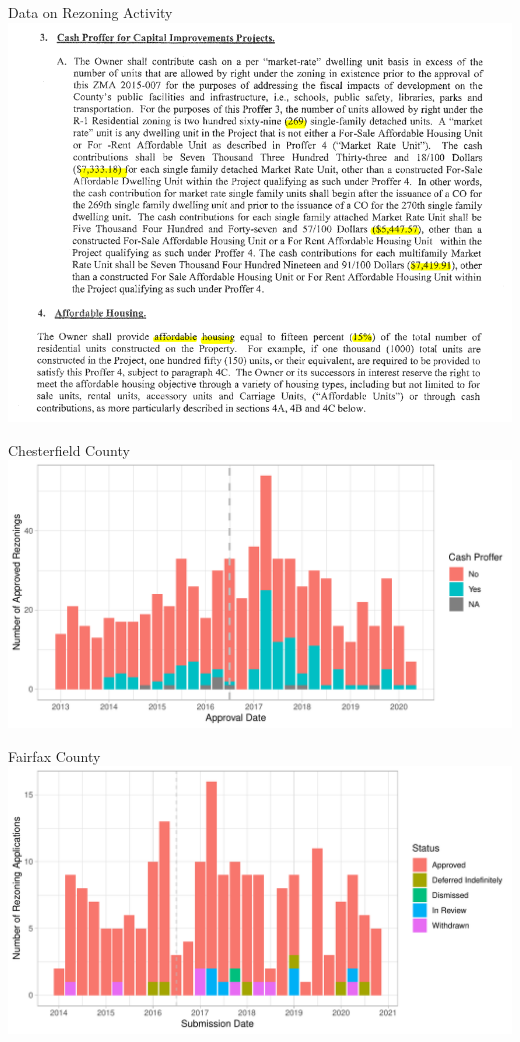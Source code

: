 \documentclass[10pt]{beamer}
\begin{document}
\begin{frame}{Data on Rezoning Activity}
    \includegraphics[width=\textwidth]{figures/images/rezoning_example2.png}
\end{frame}

\begin{frame}{Chesterfield County}
    \includegraphics[width=\textwidth]{figures/plot_chesterfield_approvals.pdf}
\end{frame}

\begin{frame}{Fairfax County}
    \includegraphics[width=\textwidth]{figures/plot_fairfaxco_submissions.pdf}
\end{frame}
\end{document}
